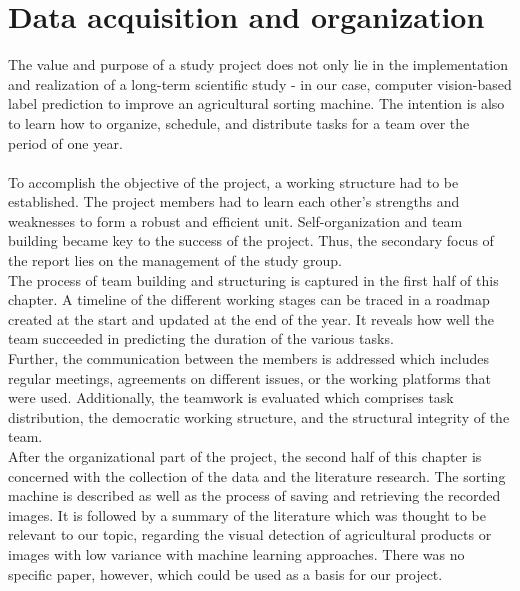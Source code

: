 
\section{Data acquisition and organization}
\label{ch:DataAcquisition}

The value and purpose of a study project does not only lie in the implementation and realization of a long-term scientific study - in our case, computer vision-based label prediction to improve an agricultural sorting machine. The intention is also to learn how to organize, schedule, and distribute tasks for a team over the period of one year. \\
 \\
To accomplish the objective of the project, a working structure had to be established. The project members had to learn each other's strengths and weaknesses to form a robust and efficient unit. Self-organization and team building became key to the success of the project. Thus, the secondary focus of the report lies on the management of the study group. \\
The process of team building and structuring is captured in the first half of this chapter. A timeline of the different working stages can be traced in a roadmap created at the start and updated at the end of the year. It reveals how well the team succeeded in predicting the duration of the various tasks. \\
Further, the communication between the members is addressed which includes regular meetings, agreements on different issues, or the working platforms that were used. Additionally, the teamwork is evaluated which comprises task distribution, the democratic working structure, and the structural integrity of the team. \\
After the organizational part of the project, the second half of this chapter is concerned with the collection of the data and the literature research. The sorting machine is described as well as the process of saving and retrieving the recorded images. It is followed by a summary of the literature which was thought to be relevant to our topic, regarding the visual detection of agricultural products or images with low variance with machine learning approaches. There was no specific paper, however, which could be used as a basis for our project. \\
